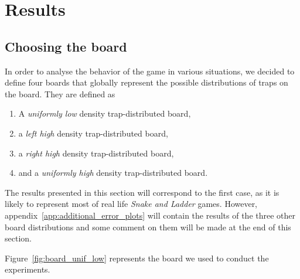 \section{Results} %
\label{sec:results}

\subsection{Choosing the board} %
\label{sub:choosing_the_board}
In order to analyse the behavior of the game in various situations,
we decided to define four boards that globally represent the possible
distributions of traps on the board. They are defined as
\begin{enumerate}
  \item A \emph{uniformly low} density trap-distributed board,
  \item a \emph{left high} density trap-distributed board,
  \item a \emph{right high} density trap-distributed board,
  \item and a \emph{uniformly high} density trap-distributed board.
\end{enumerate}
The results presented in this section will correspond to the first case,
as it is likely to represent most of real life \emph{Snake and Ladder} games.
However, appendix~\ref{app:additional_error_plots} will contain the results
of the three other board distributions and some comment on them will be
made at the end of this section.


Figure~\ref{fig:board_unif_low} represents the board we used to conduct the experiments.

